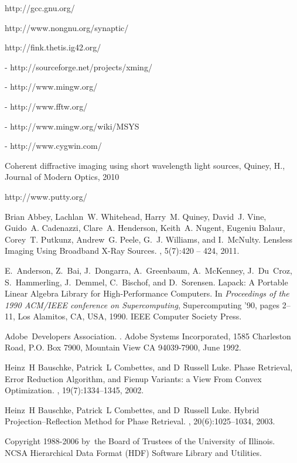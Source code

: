 \documentclass[]{nadia}
\begin{document}
\begin{thebibliography}{50}
 http://gcc.gnu.org/

 http://www.nongnu.org/synaptic/

 http://fink.thetis.ig42.org/

 - http://sourceforge.net/projects/xming/

 - http://www.mingw.org/

 - http://www.fftw.org/

 - http://www.mingw.org/wiki/MSYS

 - http://www.cygwin.com/

 Coherent diffractive imaging using short wavelength light sources, Quiney, H., Journal of Modern Optics, 2010

 http://www.putty.org/

Brian Abbey, Lachlan~W. Whitehead, Harry~M. Quiney, David~J. Vine, Guido~A.
  Cadenazzi, Clare~A. Henderson, Keith~A. Nugent, Eugeniu Balaur, Corey~T.
  Putkunz, Andrew~G. Peele, G.~J. Williams, and I.~McNulty.
\newblock Lensless Imaging Using Broadband X-Ray Sources.
, 5(7):420 -- 424, 2011.

E.~Anderson, Z.~Bai, J.~Dongarra, A.~Greenbaum, A.~McKenney, J.~Du~Croz,
  S.~Hammerling, J.~Demmel, C.~Bischof, and D.~Sorensen.
\newblock Lapack: A Portable Linear Algebra Library for High-Performance
  Computers.
\newblock In {\em Proceedings of the 1990 ACM/IEEE conference on
  Supercomputing}, Supercomputing '90, pages 2--11, Los Alamitos, CA, USA,
  1990. IEEE Computer Society Press.

 Adobe~Developers Association. . \newblock Adobe Systems Incorporated, 1585 Charleston Road, P.O. Box 7900, Mountain View CA 94039-7900, June 1992.

Heinz~H Bauschke, Patrick~L Combettes, and D~Russell Luke.
\newblock Phase Retrieval, Error Reduction Algorithm, and Fienup Variants: a
  View From Convex Optimization.
, 19(7):1334--1345, 2002.

Heinz~H Bauschke, Patrick~L Combettes, and D~Russell Luke.
\newblock Hybrid Projection--Reflection Method for Phase Retrieval.
, 20(6):1025--1034, 2003.

Copyright 1988-2006 by~the Board of Trustees of the University~of Illinois.
\newblock NCSA Hierarchical Data Format (HDF) Software Library and Utilities.


\end{thebibliography}
\end{document}
